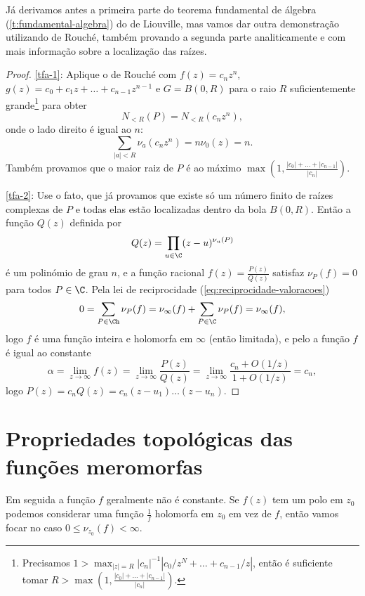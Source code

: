 Já derivamos antes a primeira parte do teorema fundamental de álgebra (\cref{t:fundamental-algebra})
do  de Liouville,
mas vamos dar outra demonstração utilizando  de Rouché,
também provando a segunda parte analiticamente e com mais informação sobre
a localização das raízes.
\tfa*
\begin{proof}
\eqref{tfa-1}: 
Aplique o  de Rouché com $f(z) = c_n z^n$,
$g(z) = c_0 + c_1 z + \dots + c_{n-1} z^{n-1}$ e $G = B(0,R)$
para o raio $R$ suficientemente grande\footnote{Precisamos
$1 > \max_{|z|=R} |c_n|^{-1} |c_0/z^N + \dots + c_{n-1}/z|$,
então é suficiente tomar $R>\max(1,\frac{|c_0|+\dots+|c_{n-1}|}{|c_n|})$.}
para obter
\[ N_{<R}(P) = N_{<R}(c_n z^n), \]
onde o lado direito é igual ao $n$:
\[ \sum_{|a|<R} \nu_a(c_n z^n) = n \nu_0(z) = n. \]
Também provamos que o maior raiz de $P$ é ao máximo $\max(1,\frac{|c_0|+\dots+|c_{n-1}|}{|c_n|})$.

\eqref{tfa-2}: Use o fato, que já provamos que existe só um número finito de raízes complexas de $P$
e todas elas estão localizadas dentro da bola $B(0,R)$. Então a função $Q(z)$ definida por
\[ Q(z) = \prod_{u\in\C} (z-u)^{\nu_u(P)} \]
é um polinómio de grau $n$, e a função racional $f(z) = \frac{P(z)}{Q(z)}$
satisfaz $\nu_P(f) = 0$ para todos $P\in\C$.
Pela lei de reciprocidade (\cref{eq:reciprocidade-valoracoes})
\[ 0 = \sum_{P\in\Ch} \nu_P(f) = \nu_\infty(f) + \sum_{P\in\C} \nu_P(f) = \nu_\infty(f), \]
logo $f$ é uma função inteira e holomorfa em $\infty$ (então limitada),
e pelo  a função $f$ é igual ao constante
\[ \alpha = \lim_{z\to\infty} f(z) = \lim_{z\to\infty} \frac{P(z)}{Q(z)} = \lim_{z\to\infty} \frac{c_n + O(1/z)}{1+O(1/z)} = c_n, \]
logo $P(z) = c_n Q(z) = c_n (z-u_1) \dots (z-u_n)$.
\end{proof}


\section{Propriedades topológicas das funções meromorfas}

Em seguida a função $f$ geralmente não é constante.
Se $f(z)$ tem um polo em $z_0$ podemos considerar uma função $\frac{1}{f}$ holomorfa em $z_0$
em vez de $f$, então vamos focar no caso $0\leq \nu_{z_0}(f) < \infty$.

